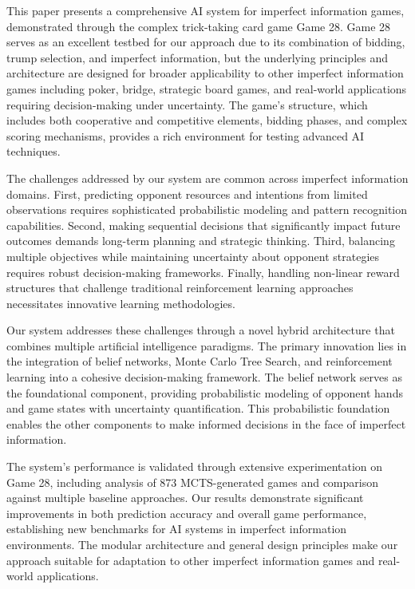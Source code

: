 \documentclass[conference]{IEEEtran}
\begin{document}
This paper presents a comprehensive AI system for imperfect information games, demonstrated through the complex trick-taking card game Game 28. Game 28 serves as an excellent testbed for our approach due to its combination of bidding, trump selection, and imperfect information, but the underlying principles and architecture are designed for broader applicability to other imperfect information games including poker, bridge, strategic board games, and real-world applications requiring decision-making under uncertainty. The game's structure, which includes both cooperative and competitive elements, bidding phases, and complex scoring mechanisms, provides a rich environment for testing advanced AI techniques.

The challenges addressed by our system are common across imperfect information domains. First, predicting opponent resources and intentions from limited observations requires sophisticated probabilistic modeling and pattern recognition capabilities. Second, making sequential decisions that significantly impact future outcomes demands long-term planning and strategic thinking. Third, balancing multiple objectives while maintaining uncertainty about opponent strategies requires robust decision-making frameworks. Finally, handling non-linear reward structures that challenge traditional reinforcement learning approaches necessitates innovative learning methodologies.

Our system addresses these challenges through a novel hybrid architecture that combines multiple artificial intelligence paradigms. The primary innovation lies in the integration of belief networks, Monte Carlo Tree Search, and reinforcement learning into a cohesive decision-making framework. The belief network serves as the foundational component, providing probabilistic modeling of opponent hands and game states with uncertainty quantification. This probabilistic foundation enables the other components to make informed decisions in the face of imperfect information.

The system's performance is validated through extensive experimentation on Game 28, including analysis of 873 MCTS-generated games and comparison against multiple baseline approaches. Our results demonstrate significant improvements in both prediction accuracy and overall game performance, establishing new benchmarks for AI systems in imperfect information environments. The modular architecture and general design principles make our approach suitable for adaptation to other imperfect information games and real-world applications.
\end{document}

